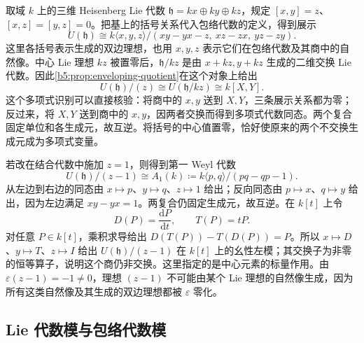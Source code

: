 \ProseParagraphBreak

取域 \(k\) 上的三维 Heisenberg Lie 代数 \(\mathfrak h=kx\oplus ky\oplus kz\)，规定 \([x,y]=z\)、\([x,z]=[y,z]=0\)。把基上的括号关系代入包络代数的定义，得到展示
\[
	U(\mathfrak h)\cong k\langle x,y,z\rangle/(xy-yx-z,\ xz-zx,\ yz-zy).
\]
这里各括号表示生成的双边理想，也用 \(x,y,z\) 表示它们在包络代数及其商中的自然像。中心 Lie 理想 \(kz\) 被置零后，\(\mathfrak h/kz\) 是由 \(x+kz,y+kz\) 生成的二维交换 Lie 代数。因此\cref{b5:prop:enveloping-quotient}在这个对象上给出
\[
	U(\mathfrak h)/(z)\cong U(\mathfrak h/kz)\cong k[X,Y].
\]
这个多项式识别可以直接核验：将商中的 \(x,y\) 送到 \(X,Y\)，三条展示关系都为零；反过来，将 \(X,Y\) 送到商中的 \(x,y\)，因两者交换而得到多项式代数同态。两个复合固定单位和各生成元，故互逆。将括号的中心值置零，恰好使原来的两个不交换生成元成为多项式变量。

\ProseParagraphBreak

若改在结合代数中施加 \(z=1\)，则得到第一 Weyl 代数
\[
	U(\mathfrak h)/(z-1)\cong A_1(k)\coloneqq k\langle p,q\rangle/(pq-qp-1).
\]
从左边到右边的同态由 \(x\mapsto p\)、\(y\mapsto q\)、\(z\mapsto1\) 给出；反向同态由 \(p\mapsto x\)、\(q\mapsto y\) 给出，因为左边满足 \(xy-yx=1\)。两复合仍固定生成元，故互逆。在 \(k[t]\) 上令
\[
	D(P)=\frac{\mathrm{d}P}{\mathrm{d}t},\qquad T(P)=tP.
\]
对任意 \(P\in k[t]\)，乘积求导给出 \(D(T(P))-T(D(P))=P\)。所以 \(x\mapsto D\)、\(y\mapsto T\)、\(z\mapsto I\) 给出 \(U(\mathfrak h)/(z-1)\) 在 \(k[t]\) 上的幺性左模；其交换子为非零的恒等算子，说明这个商仍非交换。这里指定的是中心元素的标量作用。由 \(\varepsilon(z-1)=-1\ne0\)，理想 \((z-1)\) 不可能由某个 Lie 理想的自然像生成，因为所有这类自然像及其生成的双边理想都被 \(\varepsilon\) 零化。

\subsection{Lie 代数模与包络代数模}
\label{b5:subsec:1501:03}

